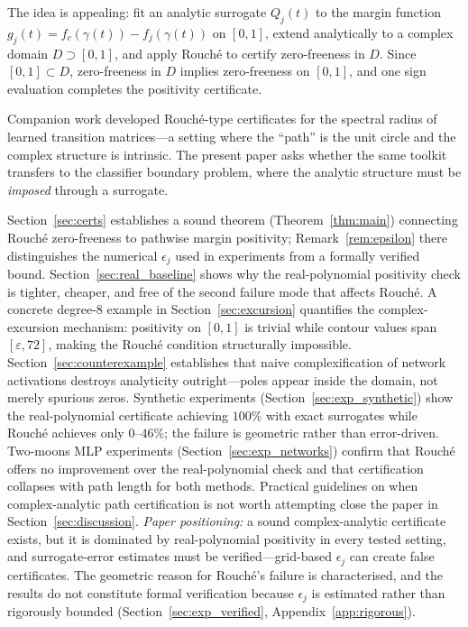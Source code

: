 \documentclass{article}
\theoremstyle{definition}
\begin{document}
The idea is appealing: fit an analytic surrogate $Q_j(t)$ to the margin
function $g_j(t) = f_c(\gamma(t)) - f_j(\gamma(t))$ on $[0,1]$, extend
analytically to a complex domain $D\supset[0,1]$, and apply Rouch\'e to
certify zero-freeness in $D$.  Since $[0,1]\subset D$, zero-freeness in $D$
implies zero-freeness on $[0,1]$, and one sign evaluation completes the
positivity certificate.

Companion work developed Rouch\'e-type certificates for the spectral radius
of learned transition matrices---a setting where the ``path'' is the unit
circle and the complex structure is intrinsic.  The present paper asks whether
the same toolkit transfers to the classifier boundary problem, where the
analytic structure must be \emph{imposed} through a surrogate.

Section~\ref{sec:certs} establishes a sound theorem (Theorem~\ref{thm:main})
connecting Rouch\'e zero-freeness to pathwise margin positivity;
Remark~\ref{rem:epsilon} there distinguishes the numerical $\epsilon_j$ used
in experiments from a formally verified bound.  Section~\ref{sec:real_baseline}
shows why the real-polynomial positivity check is tighter, cheaper, and free
of the second failure mode that affects Rouch\'e.  A concrete degree-8 example
in Section~\ref{sec:excursion} quantifies the complex-excursion mechanism:
positivity on $[0,1]$ is trivial while contour values span
$[\varepsilon, 72]$, making the Rouch\'e condition structurally impossible.
Section~\ref{sec:counterexample} establishes that naive complexification of
network activations destroys analyticity outright---poles appear inside the
domain, not merely spurious zeros.  Synthetic experiments
(Section~\ref{sec:exp_synthetic}) show the real-polynomial certificate
achieving $100\%$ with exact surrogates while Rouch\'e achieves only
$0$--$46\%$; the failure is geometric rather than error-driven.  Two-moons
MLP experiments (Section~\ref{sec:exp_networks}) confirm that Rouch\'e offers
no improvement over the real-polynomial check and that certification collapses
with path length for both methods.  Practical guidelines on when
complex-analytic path certification is not worth attempting close the paper in
Section~\ref{sec:discussion}.
\emph{Paper positioning:} a sound complex-analytic certificate exists, but
it is dominated by real-polynomial positivity in every tested setting, and
surrogate-error estimates must be verified---grid-based $\epsilon_j$ can
create false certificates.  The geometric reason for Rouch\'e's failure is
characterised, and the results do not constitute formal verification because
$\epsilon_j$ is estimated rather than rigorously bounded
(Section~\ref{sec:exp_verified}, Appendix~\ref{app:rigorous}).
\end{document}
